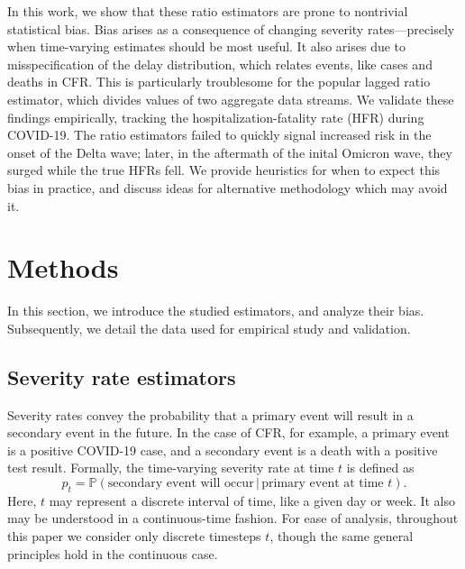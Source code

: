 \documentclass{article}
\newcommand{\given}{\, \vert \,}
\newcommand{\djmcomment}[1]{{\color{teal}[DJM: #1]}}
\newcommand{\jmgcomment}[1]{{\color{cyan}[JMG: #1]}}
\begin{document}
In this work, we show that these ratio estimators are prone to nontrivial
statistical bias. Bias arises as a consequence of changing severity
rates---precisely when time-varying estimates should be most useful. It also 
arises due to misspecification of the delay distribution, which relates events, 
like cases and deaths in CFR. This is particularly troublesome for the popular
lagged ratio estimator, which divides values of two aggregate data streams. We
validate these findings empirically, tracking the hospitalization-fatality rate
(HFR) during COVID-19. The ratio estimators failed to quickly signal increased
risk in the onset of the Delta wave; later, in the aftermath of the inital
Omicron wave, they surged while the true HFRs fell. We provide heuristics for
when to expect this bias in practice, and discuss ideas for alternative
methodology which may avoid it. 

\section{Methods}\label{sec:methods}
In this section, we introduce the studied estimators, and analyze their bias. Subsequently, we detail the data used for empirical study and validation. 

\subsection{Severity rate estimators}\label{sec:defs}

Severity rates convey the probability that a primary event will result in a secondary event in the future. 
In the case of CFR, for example, a primary event is a positive COVID-19 case, and a secondary event is a death with a positive test result.
Formally, the time-varying severity rate at time $t$ is defined as
\begin{equation}\label{eq:severity}
    p_t = \mathbb{P}(\text{secondary event will occur}\given\text{primary event at time }t).
\end{equation}
Here, $t$ may represent a discrete interval of time, like a given day or week. It also may be understood in a continuous-time fashion. 
For ease of analysis, throughout this paper we consider only discrete timesteps $t$, though the same general principles hold in the continuous case. 
\end{document}
